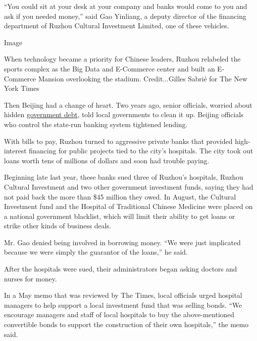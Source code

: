 ``You could sit at your desk at your company and banks would come to you
and ask if you needed money,'' said Gao Yinliang, a deputy director of
the financing department of Ruzhou Cultural Investment Limited, one of
these vehicles.

Image

When technology became a priority for Chinese leaders, Ruzhou relabeled
the sports complex as the Big Data and E-Commerce center and built an
E-Commerce Mansion overlooking the stadium. Credit...Gilles Sabrié for
The New York Times

Then Beijing had a change of heart. Two years ago, senior officials,
worried about hidden
\href{http://snapshot.sogoucdn.com/websnapshot?ie=utf8\&url=http\%3A\%2F\%2Fwww.cnfinance.cn\%2Fmagzi\%2F2019-03\%2F18-29459.html\&did=e4afc4d0af959068-a7454eb9f6bf81e5-d50b88fa17979eff59feb12c69f52f54\&k=281577afe7d4283eef725f3c2a1851da\&encodedQuery=\%E7\%8E\%8B\%E6\%99\%AF\%E6\%AD\%A6\%20\%E7\%81\%B0\%E7\%8A\%80\%E7\%89\%9B\&query=\%E7\%8E\%8B\%E6\%99\%AF\%E6\%AD\%A6\%20\%E7\%81\%B0\%E7\%8A\%80\%E7\%89\%9B\&\&w=01020400\&m=0\&st=0}{government
debt}, told local governments to clean it up. Beijing officials who
control the state-run banking system tightened lending.

With bills to pay, Ruzhou turned to aggressive private banks that
provided high-interest financing for public projects tied to the city's
hospitals. The city took out loans worth tens of millions of dollars and
soon had trouble paying.

Beginning late last year, these banks sued three of Ruzhou's hospitals,
Ruzhou Cultural Investment and two other government investment funds,
saying they had not paid back the more than \$45 million they owed. In
August, the Cultural Investment fund and the Hospital of Traditional
Chinese Medicine were placed on a national government blacklist, which
will limit their ability to get loans or strike other kinds of business
deals.

Mr. Gao denied being involved in borrowing money. ``We were just
implicated because we were simply the guarantor of the loans,'' he said.

After the hospitals were sued, their administrators began asking doctors
and nurses for money.

In a May memo that was reviewed by The Times, local officials urged
hospital managers to help support a local investment fund that was
selling bonds. ``We encourage managers and staff of local hospitals to
buy the above-mentioned convertible bonds to support the construction of
their own hospitals,'' the memo said.

